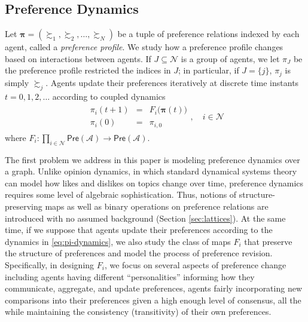 \documentclass[conference]{ieeeconf}
\newcommand{\N}{\mathcal{N}}
\newcommand{\A}{\mathcal{A}}
\newcommand{\Pref}{\mathsf{Pre}}
\newcommand{\prefers}{\succsim}
\newcommand{\profile}{\boldsymbol{\pi}}
\newtheorem{example}{Example}
\begin{document}

\subsection{Preference Dynamics}

Let $\profile = \left( \prefers_1, \prefers_2, \dots, \prefers_N \right)$ be a tuple of preference relations indexed by each agent, called a \emph{preference profile}. We study how a preference profile changes based on interactions between agents. If $J \subseteq \N$ is a group of agents, we let $\pi_{J}$ be the preference profile restricted the indices in $J$; in particular, if $J = \{j\}$, $\pi_j$ is simply $\prefers_j$.
Agents update their preferences iteratively at discrete time instants $t=0,1,2,\dots$ according to coupled dynamics
\begin{align}
    \begin{aligned}
        \pi_i(t+1) &=& F_i \bigl( \profile(t) \bigr)  \\
        \pi_i(0) &=& \pi_{i,0}
    \end{aligned}, \quad i \in \N
    \label{eq:pi-dynamics}
\end{align}
where $F_i: \prod_{i \in \N}  \Pref(\A) \to \Pref(\A)$.

The first problem we address in this paper is modeling preference dynamics over a graph. Unlike opinion dynamics, in which standard dynamical systems theory can model how likes and dislikes on topics change over time, preference dynamics requires some level of algebraic sophistication. Thus, notions of structure-preserving maps as well as binary operations on preference relations are introduced with no assumed background (Section \ref{sec:lattices}). At the same time, if we suppose that agents update their preferences according to the dynamics in \eqref{eq:pi-dynamics}, we also study the class of maps $F_i$ that preserve the structure of preferences and model the process of preference revision. Specifically, in designing $F_i$, we focus on several aspects of preference change including agents having different ``personalities'' informing how they communicate, aggregate, and update preferences, agents fairly incorporating new comparisons into their preferences given a high enough level of consensus, all the while maintaining the consistency (transitivity) of their own preferences.
\end{document}
